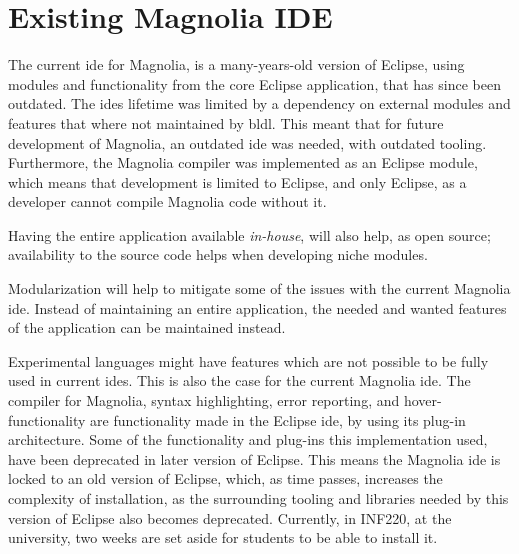 \section{Existing Magnolia IDE}

The current \gls{ide} for Magnolia, is a many-years-old version of Eclipse,
using modules and functionality from the core Eclipse application, that has
since been outdated. The \gls{ide}s lifetime was limited by a dependency on
external modules and features that where not maintained by \gls{bldl}. This
meant that for future development of Magnolia, an outdated \gls{ide} was needed,
with outdated tooling. Furthermore, the Magnolia compiler was implemented as an
Eclipse module, which means that development is limited to Eclipse, and only
Eclipse, as a developer cannot compile Magnolia code without it.

Having the entire application available \textit{in-house}, will also help, as
open source; availability to the source code helps when developing niche
modules.

Modularization will help to mitigate some of the issues with the current
Magnolia \gls{ide}. Instead of maintaining an entire application, the needed and
wanted features of the application can be maintained instead.

Experimental languages might have features which are not possible to be fully
used in current \gls{ide}s. This is also the case for the current Magnolia
\gls{ide}. The compiler for Magnolia, syntax highlighting, error reporting, and
hover-functionality are functionality made in the Eclipse \gls{ide}, by using
its plug-in architecture. Some of the functionality and plug-ins this
implementation used, have been deprecated in later version of Eclipse. This
means the Magnolia \gls{ide} is locked to an old version of Eclipse, which, as
time passes, increases the complexity of installation, as the surrounding
tooling and libraries needed by this version of Eclipse also becomes deprecated.
Currently, in INF220, at the university, two weeks are set aside for students to
be able to install it.

